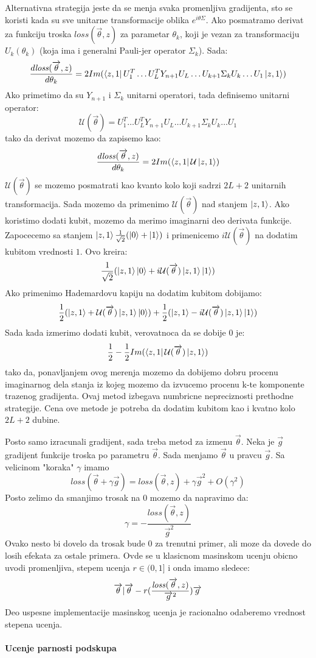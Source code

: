 \documentclass[12pt, letterpaper, oneside]{article}
\begin{document}
Alternativna strategija jeste da se menja svaka promenljiva gradijenta, sto se koristi kada su sve unitarne transformacije oblika $e^{i\theta\Sigma}$.
Ako posmatramo derivat za funkciju troska $\mathit{loss}(\overrightarrow{\theta},z)$ za parametar $\theta_k$, koji je vezan za transformaciju $U_k(\theta_k)$
(koja ima i generalni Pauli-jer operator $\Sigma_k$). Sada:
\[
    \frac{d\mathit{loss}(\overrightarrow{\theta},z)}{d\theta_k} = 2Im(\Bra{z,1}U_1^T \dots U_L^TY_{n+1}U_L \dots U_{k+1} \Sigma_k U_k \dots U_1 \Ket{z,1})
\]
Ako primetimo da su $Y_{n+1}$ i $\Sigma_k$ unitarni operatori, tada definisemo unitarni operator:
\[
    \mathcal{U}(\overrightarrow{\theta}) = U_1^T \dots U_L^TY_{n+1}U_L \dots U_{k+1} \Sigma_k U_k \dots U_1
\]
tako da derivat mozemo da zapisemo kao:
\[
    \frac{d\mathit{loss}(\overrightarrow{\theta},z)}{d\theta_k} = 2Im(\Bra{z,1}\mathcal{U}\Ket{z,1})
\]
$\mathcal{U}(\overrightarrow{\theta})$ se mozemo posmatrati kao kvanto kolo koji sadrzi $2L+2$ unitarnih transformacija.
Sada mozemo da primenimo $\mathcal{U}(\overrightarrow{\theta})$ nad stanjem $\Ket{z,1}$. Ako koristimo dodati kubit, mozemo da merimo imaginarni deo
derivata funkcije. Zapocecemo sa stanjem $\Ket{z,1}\frac{1}{\sqrt{2}}(\Ket{0}+\Ket{1})$ i primenicemo $i\mathcal{U}(\overrightarrow{\theta})$ na dodatim kubitom vrednosti $1$.
Ovo kreira:
\[
    \frac{1}{\sqrt{2}}(\Ket{z,1}\Ket{0} + i\mathcal{U}(\overrightarrow{\theta})\Ket{z,1}\Ket{1})
\]
Ako primenimo Hademardovu kapiju na dodatim kubitom dobijamo:
\[
    \frac{1}{2}(\Ket{z,1}+\mathcal{U}(\overrightarrow{\theta})\Ket{z,1}\Ket{0}) + \frac{1}{2}(\Ket{z,1}-i\mathcal{U}(\overrightarrow{\theta})\Ket{z,1}\Ket{1})
\]
Sada kada izmerimo dodati kubit, verovatnoca da se dobije $0$ je:
\[
    \frac{1}{2} - \frac{1}{2}Im(\bra{z,1}\mathcal{U}(\overrightarrow{\theta})\Ket{z,1})
\]
tako da, ponavljanjem ovog merenja mozemo da dobijemo dobru procenu imaginarnog dela stanja iz kojeg mozemo da izvucemo procenu k-te komponente trazenog gradijenta.
Ovaj metod izbegava numbricne nepreciznosti prethodne strategije. Cena ove metode je potreba da dodatim kubitom kao i kvatno kolo $2L+2$ dubine.

Posto samo izracunali gradijent, sada treba metod za izmenu $\overrightarrow{\theta}$. Neka je $\overrightarrow{g}$ gradijent funkcije troska po parametru $\overrightarrow{\theta}$.
Sada menjamo $\overrightarrow{\theta}$ u pravcu $\overrightarrow{g}$. Sa velicinom "koraka" $\gamma$ imamo
\[
    \mathit{loss}(\overrightarrow{\theta}+\gamma \overrightarrow{g}) = \mathit{loss}(\overrightarrow{\theta},z)+ \gamma \overrightarrow{g}^2 + O(\gamma^2)
\]
Posto zelimo da smanjimo trosak na $0$ mozemo da napravimo da:
\[
    \gamma = -\frac{\mathit{loss}(\overrightarrow{\theta},z)}{\overrightarrow{g}^2}
\]
Ovako nesto bi dovelo da trosak bude $0$ za trenutni primer, ali moze da dovede do losih efekata za ostale primera. 
Ovde se u klasicnom masinskom ucenju obicno uvodi promenljiva, stepem ucenja $r \in (0,1]$ i onda imamo sledece:
\[
    \overrightarrow{\theta} \arrowvert \overrightarrow{\theta} - r(\frac{\mathit{loss}(\overrightarrow{\theta},z)}{\overrightarrow{g}^2})\overrightarrow{g}
\]
Deo uspesne implementacije masinskog ucenja je racionalno odaberemo vrednost stepena ucenja.

\paragraph{Ucenje parnosti podskupa}

\newpage
\printbibliography
\end{document}
